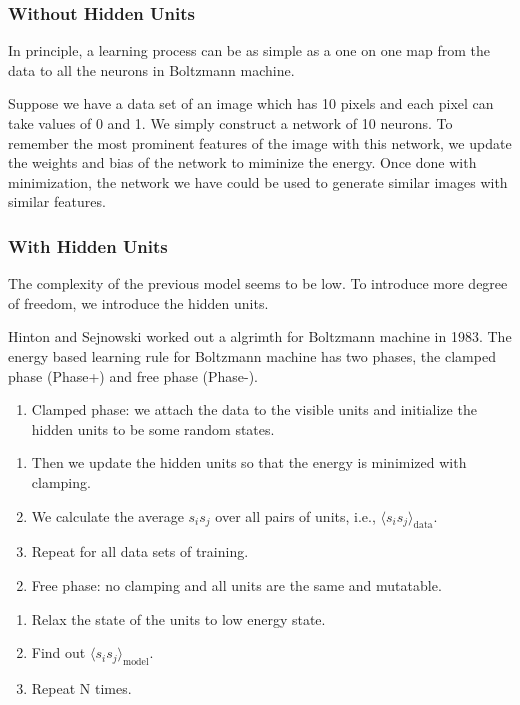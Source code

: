 \documentclass[letterpaper,10pt,english]{sphinxmanual}
\begin{document}
\subsubsection{Without Hidden Units}
\label{\detokenize{machine-intelligence/boltzmann-machine:without-hidden-units}}
In principle, a learning process can be as simple as a one on one map from the data to all the neurons in Boltzmann machine.

Suppose we have a data set of an image which has 10 pixels and each pixel can take values of 0 and 1. We simply construct a network of 10 neurons. To remember the most prominent features of the image with this network, we update the weights and bias of the network to miminize the energy. Once done with minimization, the network we have could be used to generate similar images with similar features.


\subsubsection{With Hidden Units}
\label{\detokenize{machine-intelligence/boltzmann-machine:with-hidden-units}}
The complexity of the previous model seems to be low. To introduce more degree of freedom, we introduce the hidden units.

Hinton and Sejnowski worked out a algrimth for Boltzmann machine in 1983. The energy based learning rule for Boltzmann machine has two phases, the clamped phase (Phase+) and free phase (Phase-).
\begin{enumerate}
\item {} 
Clamped phase: we attach the data to the visible units and initialize the hidden units to be some random states.

\end{enumerate}
\begin{enumerate}
\item {} 
Then we update the hidden units so that the energy is minimized with clamping.

\item {} 
We calculate the average \(s_i s_j\) over all pairs of units, i.e., \(\langle s_i s_j\rangle_{\mathrm{data}}\).

\item {} 
Repeat for all data sets of training.

\end{enumerate}
\begin{enumerate}
\setcounter{enumi}{1}
\item {} 
Free phase: no clamping and all units are the same and mutatable.

\end{enumerate}
\begin{enumerate}
\item {} 
Relax the state of the units to low energy state.

\item {} 
Find out \(\langle s_i s_j\rangle_{\mathrm{model}}\).

\item {} 
Repeat N times.

\end{enumerate}
\end{document}
